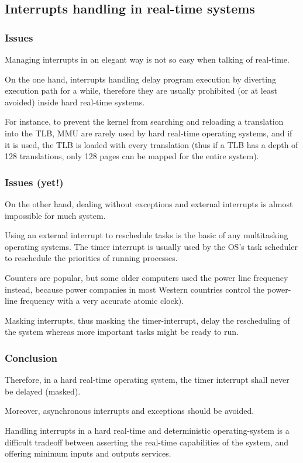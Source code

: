 
\subsection{Interrupts handling in real-time systems}

\begin{frame}
  \frametitle{Issues}

Managing interrupts in an elegant way is not so easy when talking of real-time.

\-

 On the one hand, interrupts handling delay program execution by diverting execution path for a while, therefore they are usually prohibited (or at least avoided) inside hard real-time systems.

\-

For instance, to prevent the kernel from searching and reloading a translation into the TLB, MMU are rarely used by hard real-time operating systems, and if it is used, the TLB is loaded with every translation (thus if a TLB has a depth of 128 translations, only 128 pages can be mapped for the entire system).

\end{frame}


\begin{frame}
  \frametitle{Issues (yet!)}

On the other hand, dealing without exceptions and external interrupts is almost impossible for much system.

\-

 Using an external interrupt to reschedule tasks is the basic of any multitasking operating systems. The timer interrupt is usually used by the OS's task scheduler to reschedule the priorities of running processes.

\-

Counters are popular, but some older computers used the power line frequency instead, because power companies in most Western countries control the power-line frequency with a very accurate atomic clock).

\-

Masking interrupts, thus masking the timer-interrupt, delay the rescheduling of the system whereas more important tasks might be ready to run.

\end{frame}


\begin{frame}
  \frametitle{Conclusion}

Therefore, in a hard real-time operating system, the timer interrupt shall never be delayed (masked).

\-

Moreover, asynchronous interrupts and exceptions should be avoided.

\-

 Handling interrupts in a hard real-time and deterministic operating-system is a difficult tradeoff between asserting the real-time capabilities of the system, and offering minimum inputs and outputs services.


\end{frame}

